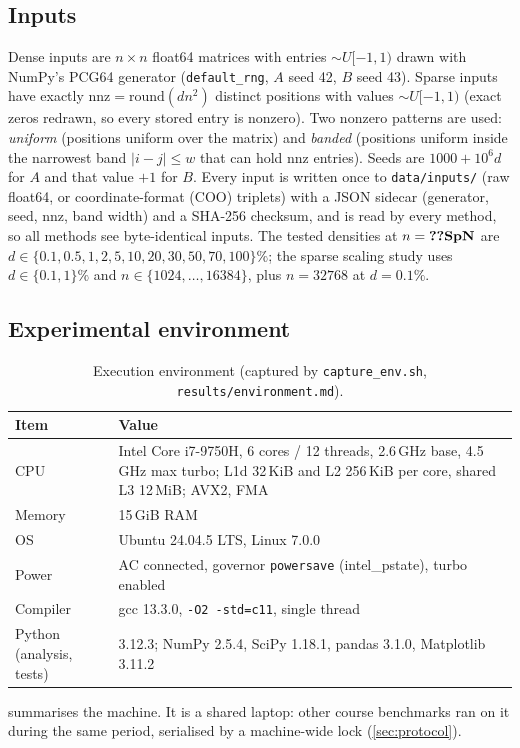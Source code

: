 \documentclass[conference,a4paper]{IEEEtran}
\begin{document}
\subsection{Inputs}
Dense inputs are $n\times n$ float64 matrices with entries $\sim U[-1,1)$ drawn with NumPy's PCG64 generator
(\texttt{default\_rng}, $A$ seed 42, $B$ seed 43). Sparse inputs have exactly $\mathrm{nnz}=\mathrm{round}(dn^2)$
distinct positions with values $\sim U[-1,1)$ (exact zeros redrawn, so every stored entry is nonzero). Two
nonzero patterns are used: \emph{uniform} (positions uniform over the matrix) and \emph{banded} (positions
uniform inside the narrowest band $|i-j|\le w$ that can hold nnz entries). Seeds are $1000+10^6d$ for $A$ and
that value $+1$ for $B$. Every input is written once to \texttt{data/inputs/} (raw float64, or coordinate-format (COO) triplets) with
a JSON sidecar (generator, seed, nnz, band width) and a SHA-256 checksum, and is read by every method, so all
methods see byte-identical inputs. The tested densities at $n=\val{SpN}$ are
$d\in\{0.1,0.5,1,2,5,10,20,30,50,70,100\}\%$; the sparse scaling study uses $d\in\{0.1,1\}\%$ and
$n\in\{1024,\ldots,16384\}$, plus $n=32768$ at $d=0.1\%$.

\subsection{Experimental environment}
\begin{table}[t]
\centering
\caption{Execution environment (captured by \texttt{capture\_env.sh}, \texttt{results/environment.md}).}
\label{tab:env}
\footnotesize
\begin{tabular}{@{}lp{}@{}}
\toprule
Item & Value \\
\midrule
CPU & Intel Core i7-9750H, 6 cores / 12 threads, 2.6\,GHz base, 4.5\,GHz max turbo; L1d 32\,KiB and
  L2 256\,KiB per core, shared L3 12\,MiB; AVX2, FMA \\
Memory & 15\,GiB RAM \\
OS & Ubuntu 24.04.5 LTS, Linux 7.0.0 \\
Power & AC connected, governor \texttt{powersave} (intel\_pstate), turbo enabled \\
Compiler & gcc 13.3.0, \texttt{-O2 -std=c11}, single thread \\
Python (analysis, tests) & 3.12.3; NumPy 2.5.4, SciPy 1.18.1, pandas 3.1.0, Matplotlib 3.11.2 \\
\bottomrule
\end{tabular}
\end{table}
 summarises the machine. It is a shared laptop: other course benchmarks ran on it during the
same period, serialised by a machine-wide lock (\cref{sec:protocol}).
\end{document}
